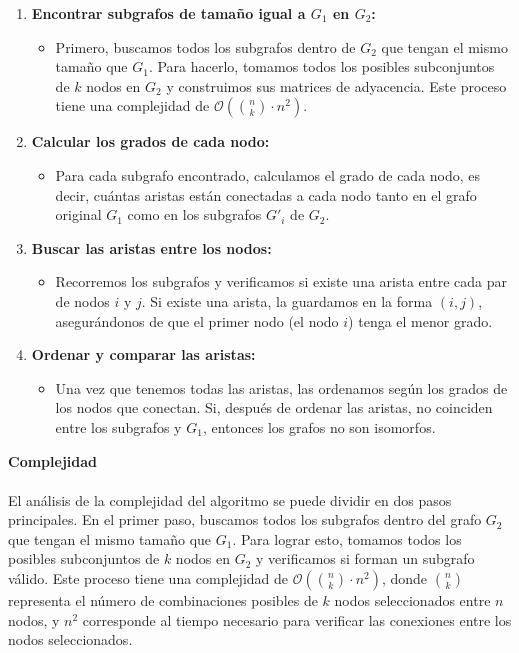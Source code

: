 \documentclass[12pt,a4paper]{article}
\begin{document}
\begin{enumerate}
    \item \textbf{Encontrar subgrafos de tamaño igual a $G_1$ en $G_2$:}
    \begin{itemize}
        \item Primero, buscamos todos los subgrafos dentro de $G_2$ que tengan el mismo tamaño que $G_1$. Para hacerlo, tomamos todos los posibles subconjuntos de $k$ nodos en $G_2$ y construimos sus matrices de adyacencia. Este proceso tiene una complejidad de $\mathcal{O}\left(\binom{n}{k} \cdot n^2\right)$.
    \end{itemize}
    
    \item \textbf{Calcular los grados de cada nodo:}
    \begin{itemize}
        \item Para cada subgrafo encontrado, calculamos el grado de cada nodo, es decir, cuántas aristas están conectadas a cada nodo tanto en el grafo original $G_1$ como en los subgrafos $G'_i$ de $G_2$.
    \end{itemize}
    
    \item \textbf{Buscar las aristas entre los nodos:}
    \begin{itemize}
        \item Recorremos los subgrafos y verificamos si existe una arista entre cada par de nodos $i$ y $j$. Si existe una arista, la guardamos en la forma $(i,j)$, asegurándonos de que el primer nodo (el nodo $i$) tenga el menor grado.
    \end{itemize}
    
    \item \textbf{Ordenar y comparar las aristas:}
    \begin{itemize}
        \item Una vez que tenemos todas las aristas, las ordenamos según los grados de los nodos que conectan. Si, después de ordenar las aristas, no coinciden entre los subgrafos y $G_1$, entonces los grafos no son isomorfos.
    \end{itemize}
\end{enumerate}
\textbf{Complejidad}\\
\\
El análisis de la complejidad del algoritmo se puede dividir en dos pasos principales. En el primer paso, buscamos todos los subgrafos dentro del grafo \( G_2 \) que tengan el mismo tamaño que \( G_1 \). Para lograr esto, tomamos todos los posibles subconjuntos de \( k \) nodos en \( G_2 \) y verificamos si forman un subgrafo válido. Este proceso tiene una complejidad de \( \mathcal{O}\left(\binom{n}{k} \cdot n^2\right) \), donde \( \binom{n}{k} \) representa el número de combinaciones posibles de \( k \) nodos seleccionados entre \( n \) nodos, y \( n^2 \) corresponde al tiempo necesario para verificar las conexiones entre los nodos seleccionados.
\end{document}
